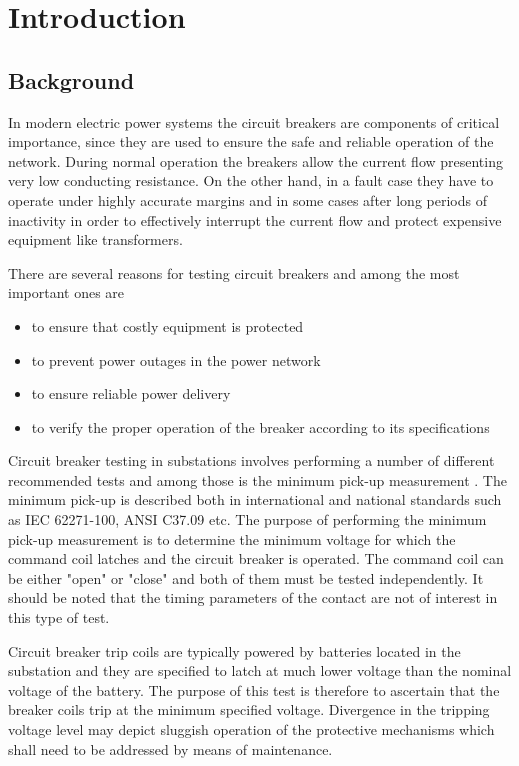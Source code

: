 
\section{Introduction}{\label{Intro}}
\subsection{Background}

In modern electric power systems the circuit breakers are components of critical importance, since they are used to ensure the safe and reliable operation of the network. During normal operation the breakers allow the current flow presenting very low conducting resistance. On the other hand, in a fault case they have to operate under highly accurate margins and in some cases after long periods of inactivity in order to effectively interrupt the current flow and protect expensive equipment like transformers. 

There are several reasons for testing circuit breakers and among the most important ones are \cite{meggertg} 
\begin{itemize}
    \item to ensure that costly equipment is protected
    \item to prevent power outages in the power network
    \item to ensure reliable power delivery
    \item to verify the proper operation of the breaker according to its specifications
\end{itemize}

Circuit breaker testing in substations involves performing a number of different recommended tests and among those is the minimum pick-up measurement \cite{meggercb,sweetserch}. The minimum pick-up is described both in international and national standards such as IEC 62271-100, ANSI C37.09 etc. The purpose of performing the minimum pick-up measurement is to determine the minimum voltage for which the command coil latches and the circuit breaker is operated. The command coil can be either "open" or "close" and both of them must be tested independently. It should be noted that the timing parameters of the contact are not of interest in this type of test.

Circuit breaker trip coils are typically powered by batteries located in the substation and they are specified to latch at much lower voltage than the nominal voltage of the battery. The purpose of this test is therefore to ascertain that the breaker coils trip at the minimum specified voltage. Divergence in the tripping voltage level may depict sluggish operation of the protective mechanisms which shall need to be addressed by means of maintenance.

